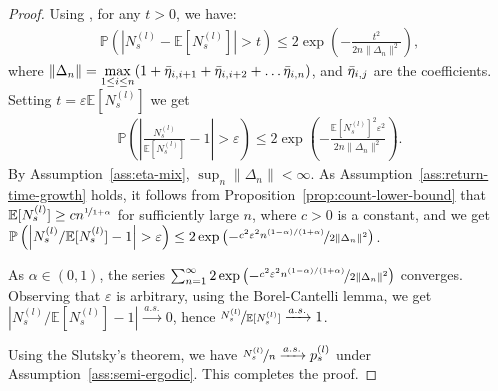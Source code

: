 \documentclass[twoside,11pt]{article}
\newcommand{\pow}[1]{^{(#1)}}%
\numberwithin{equation}{section}
\newcommand{\lp}{\left(}
\newcommand{\rp}{\right)}
\newcommand{\lv}{\left|}
\newcommand{\rv}{\right|}
\newcommand{\Pbb}{\mathbb{P}}
\newcommand{\prob}{\Pbb}
\newcommand{\expec}{\mathbb{E}}
\newcommand{\eps}{\varepsilon}
\renewcommand{\epsilon}{\eps}
\begin{document}
\begin{proof}
        Using \citet[Lemma 6]{banerjee2025off}, for any $t > 0$, we have:
  \begin{align}
      \prob(|N_s\pow{l}-\expec[N_s\pow{l}]|>t)\leq 2\exp\lp-\frac{t^2}{2n\|\Delta_n\|^2}\rp,
  \end{align}
    where $\|\Delta_n\|=\underset{1\leq i\leq n}{\max} (1+ \Bar{\eta}_{i,i+1}+ \Bar{\eta}_{i,i+2}+\dots \Bar{\eta}_{i,n})$, and $\Bar{\eta}_{i,j}$ are the coefficients.
    Setting $t=\epsilon\expec[N_s\pow l]$ we get
    \begin{align}
      \prob\lp\lv\frac{N_s\pow{l}}{\expec[N_s\pow l]}-1\rv>\eps\rp\leq 2\exp\lp-\frac{\expec[N_s\pow l]^2\eps^2}{2n\|\Delta_n\|^2}\rp.
  \end{align}
  By Assumption~\ref{ass:eta-mix}, $\sup_n \|\Delta_n\|<\infty$. 
  As Assumption~\ref{ass:return-time-growth} holds, it follows from Proposition~\ref{prop:count-lower-bound} that $\expec[N_s\pow l]\geq cn^{\nicefrac{1}{1+\alpha}}$ for sufficiently large $n$, where $c>0$ is a constant, and we get $ \prob\lp\lv{N_s\pow{l}}/{\expec[N_s\pow l]}-1\rv>\eps\rp\leq2 \exp\lp- \nicefrac{c^2 \epsilon^2 n^{(1-\alpha)/(1+\alpha)}}{2 \|\Delta_n\|^2}\rp$.
  
  As $\alpha \in (0,1)$, the series $\sum_{n=1}^\infty 2 \exp\lp- \nicefrac{c^2 \epsilon^2 n^{(1-\alpha)/(1+\alpha)}}{2 \|\Delta_n\|^2}\rp$ converges.
  Observing that $\epsilon$ is arbitrary, using the Borel-Cantelli lemma, we get $\lv{N_s\pow{l}}/{\expec[N_s\pow l]}-1\rv\xrightarrow{\ a.s. \ }0$, hence $\nicefrac{N_s\pow l}{\expec[N_s\pow l]}\xrightarrow{a.s.} 1$. 

Using the Slutsky's theorem, we have $\nicefrac{N_s\pow l}{n }\xrightarrow{a.s.} p_s \pow l$ under Assumption~\ref{ass:semi-ergodic}. This completes the proof.
\end{proof}
\end{document}
